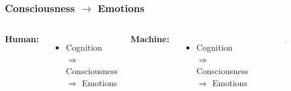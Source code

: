 \documentclass[12pt, aspectratio=169]{beamer}
\begin{document}
\begin{frame}
\frametitle{Consciousness $\rightarrow$ Emotions}
\begin{columns}[c] %

\textbf{Human:}
\begin{itemize}
\item Cognition $\Rightarrow$ Consciousness $\Rightarrow$ Emotions
\end{itemize}

\textbf{Machine:}
\begin{itemize}
\item Cognition $\Rightarrow$ Consciousness $\Rightarrow$ Emotions
\end{itemize}

\begin{figure}
\includegraphics[width=0.8\linewidth]{Kismet_312}
\end{figure}
\end{columns}
\end{frame}

\end{document}
